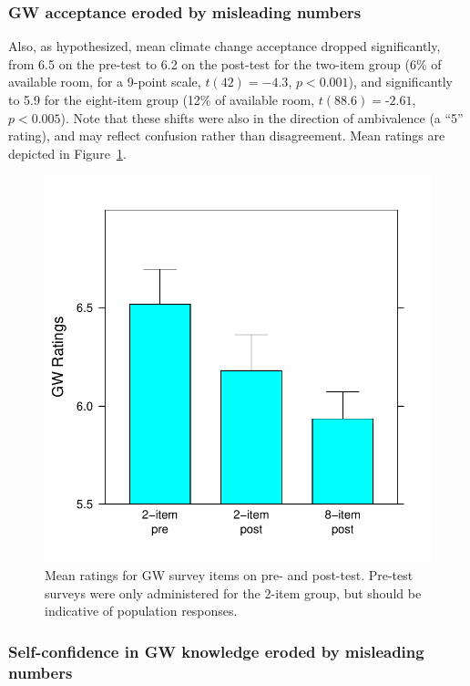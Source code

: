 \subsubsection{GW acceptance eroded by misleading numbers}

Also, as hypothesized, mean climate change acceptance dropped significantly,
from 6.5 on the pre-test to 6.2 on the post-test for the two-item group (6\% of
available room, for a 9-point scale, $t(42)=-4.3$, $p<0.001$), and significantly to
5.9 for the eight-item group (12\% of available room, $t(88.6)=‑2.61$, $p<0.005$).
Note that these shifts were also in the direction of ambivalence (a ``5''
rating), and may reflect confusion rather than disagreement. Mean ratings are
depicted in Figure~\ref{fig:evil-GW}.

\begin{figure}
    \centering
    \includegraphics{evil-GW.pdf}
    \caption{Mean ratings for GW survey items on pre- and post-test. Pre-test
        surveys were only administered for the 2-item group, but should be
        indicative of population responses.}
    \label{fig:evil-GW}
\end{figure}

\subsubsection{Self-confidence in GW knowledge eroded by misleading numbers}

